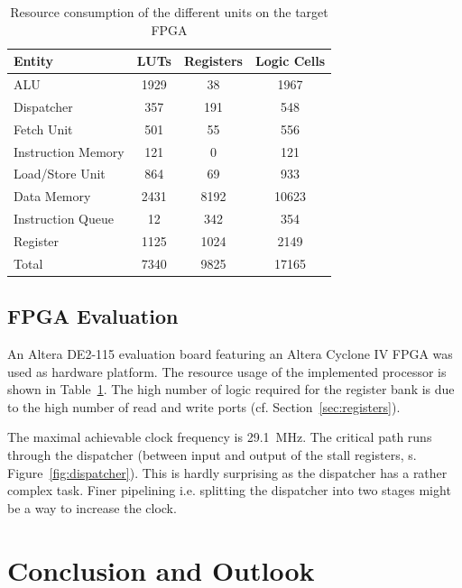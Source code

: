 \documentclass[conference]{IEEEtran}
\begin{document}
\begin{table}
	\caption{Resource consumption of the different units on the target FPGA}
	\centering
	\begin{tabular}{l c c c}
			Entity & LUTs & Registers & Logic Cells \\
		\midrule
			ALU & 1929 & 38 & 1967 \\
			Dispatcher & 357 & 191 & 548 \\
			Fetch Unit & 501 & 55 & 556 \\
			Instruction Memory & 121 & 0 & 121 \\
			Load/Store Unit & 864 & 69 & 933 \\
			Data Memory & 2431 & 8192 & 10623 \\
			Instruction Queue & 12 & 342 & 354 \\
			Register & 1125 & 1024 & 2149 \\
		\midrule
			Total & 7340 & 9825 & 17165 \\
	\end{tabular}
	\label{tab:resources}
\end{table}

\subsection{FPGA Evaluation}

An Altera DE2-115 evaluation board featuring an Altera Cyclone IV FPGA was used as hardware platform. The resource usage of the implemented processor is shown in Table~\ref{tab:resources}. 
The high number of logic required for the register bank is due to the high number of read and write ports (cf. Section~\ref{sec:registers}).

The maximal achievable clock frequency is \SI{29.1}{\MHz}. The critical path runs through the dispatcher (between input and output of the stall registers, s. Figure~\ref{fig:dispatcher}). This is hardly surprising as the dispatcher has a rather complex task. Finer pipelining i.e. splitting the dispatcher into two stages might be a way to increase the clock.

\section{Conclusion and Outlook} \label{sec:conclusion}



\cite{HP}


\printbibliography
\end{document}
